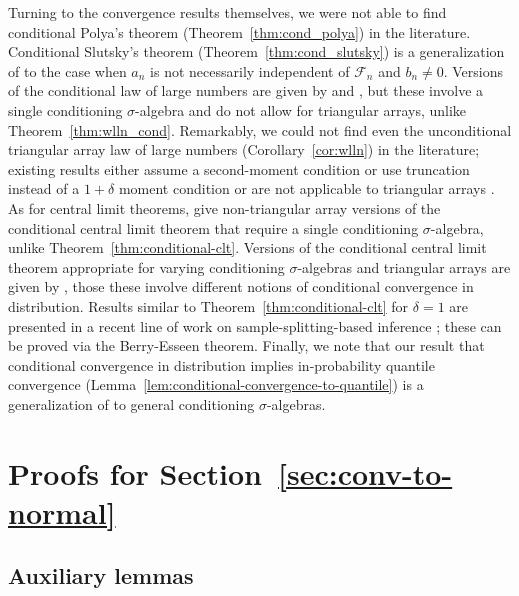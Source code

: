 \documentclass[aos]{imsart}
\theoremstyle{plain}
\theoremstyle{remark}
\begin{document}
Turning to the convergence results themselves, we were not able to find conditional Polya's theorem (Theorem~\ref{thm:cond_polya}) in the literature. Conditional Slutsky's theorem (Theorem~\ref{thm:cond_slutsky}) is a generalization of \citet[Lemma 5]{Wang2020b} to the case when $a_n$ is not necessarily independent of $\mathcal F_n$ and $b_n \neq 0$. Versions of the conditional law of large numbers are given by \cite{Majerek2005a} and \cite{PrakasaRao2009}, but these involve a single conditioning $\sigma$-algebra and do not allow for triangular arrays, unlike Theorem~\ref{thm:wlln_cond}. Remarkably, we could not find even the unconditional triangular array law of large numbers (Corollary~\ref{cor:wlln}) in the literature; existing results either assume a second-moment condition or use truncation \citep[Theorems 2.2.4 and 2.2.6, respectively]{Durrett2010} instead of a $1+\delta$ moment condition or are not applicable to triangular arrays \citep[Lemma 19]{Shah2018}. As for central limit theorems, \citet{Grzenda2008, PrakasaRao2009, Yuan2014} give non-triangular array versions of the conditional central limit theorem that require a single conditioning $\sigma$-algebra, unlike Theorem~\ref{thm:conditional-clt}. Versions of the conditional central limit theorem appropriate for varying conditioning $\sigma$-algebras and triangular arrays are given by \citet{Dedecker2002, bulinski2017conditional}, those these involve different notions of conditional convergence in distribution. Results similar to Theorem~\ref{thm:conditional-clt} for $\delta = 1$ are presented in a recent line of work on sample-splitting-based inference \citep{Kim2020a, Shekhar2022a, Shekhar2022}; these can be proved via the Berry-Esseen theorem. Finally, we note that our result that conditional convergence in distribution implies in-probability quantile convergence (Lemma~\ref{lem:conditional-convergence-to-quantile}) is a generalization of \citet[Lemma 3]{Wang2020b} to general conditioning $\sigma$-algebras.

\section{Proofs for Section~\ref{sec:conv-to-normal}}

\subsection{Auxiliary lemmas}
\end{document}
